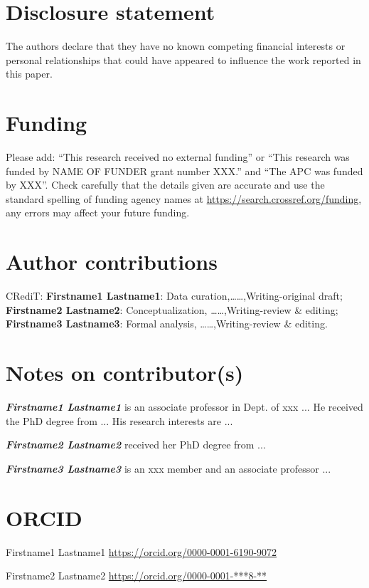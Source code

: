 \documentclass[12pt]{gsis}  %
\begin{document}
\section*{Disclosure statement}
The authors declare that they have no known competing financial interests or personal relationships that could have appeared to influence the work reported in this paper. 

\section*{Funding}
Please add: ``This research received no external funding'' or ``This research was funded by NAME OF FUNDER grant number XXX.'' and ``The APC was funded by XXX''. Check carefully that the details given are accurate and use the standard spelling of funding agency names at \url{https://search.crossref.org/funding}, any errors may affect your future funding.

\section*{Author contributions}
CRediT:  \textbf{Firstname1 Lastname1}: Data curation,……,Writing-original draft;  \textbf{Firstname2 Lastname2}: Conceptualization, ……,Writing-review \& editing; \textbf{Firstname3 Lastname3}: Formal analysis, ……,Writing-review \& editing.

\section*{Notes on contributor(s)}
\noindent \emph{\textbf{Firstname1 Lastname1}} is an associate professor in Dept. of xxx ... He received the PhD degree from ... His research interests are ...

\noindent \emph{\textbf{Firstname2 Lastname2}} received her PhD degree from ...

\noindent \emph{\textbf{Firstname3 Lastname3}} is an xxx member and an associate professor ...

\section*{ORCID}
\noindent Firstname1 Lastname1 \quad \url{https://orcid.org/0000-0001-6190-9072}

\noindent Firstname2 Lastname2 \quad  \url{https://orcid.org/0000-0001-***8-**}
\end{document}
